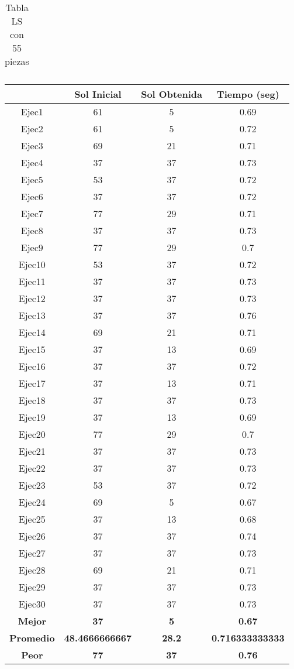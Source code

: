 \begin{center}
\begin{table}
\begin{tabular}{|c|c|c|c|}
\end{tabular}
\caption{Tabla LS con 55 piezas}
\end{table}

\begin{table}

\begin{tabular}{|c|c|c|c|}

\hline
 & {\bf Sol Inicial} & {\bf Sol Obtenida} & {\bf Tiempo (seg)} \\
\hline
Ejec1 & 61 & 5  & 0.69 \\
\hline
Ejec2 & 61 & 5  & 0.72 \\
\hline
Ejec3 & 69 & 21  & 0.71 \\
\hline
Ejec4 & 37 & 37  & 0.73 \\
\hline
Ejec5 & 53 & 37  & 0.72 \\
\hline
Ejec6 & 37 & 37  & 0.72 \\
\hline
Ejec7 & 77 & 29  & 0.71 \\
\hline
Ejec8 & 37 & 37  & 0.73 \\
\hline
Ejec9 & 77 & 29  & 0.7 \\
\hline
Ejec10 & 53 & 37  & 0.72 \\
\hline
Ejec11 & 37 & 37  & 0.73 \\
\hline
Ejec12 & 37 & 37  & 0.73 \\
\hline
Ejec13 & 37 & 37  & 0.76 \\
\hline
Ejec14 & 69 & 21  & 0.71 \\
\hline
Ejec15 & 37 & 13  & 0.69 \\
\hline
Ejec16 & 37 & 37  & 0.72 \\
\hline
Ejec17 & 37 & 13  & 0.71 \\
\hline
Ejec18 & 37 & 37  & 0.73 \\
\hline
Ejec19 & 37 & 13  & 0.69 \\
\hline
Ejec20 & 77 & 29  & 0.7 \\
\hline
Ejec21 & 37 & 37  & 0.73 \\
\hline
Ejec22 & 37 & 37  & 0.73 \\
\hline
Ejec23 & 53 & 37  & 0.72 \\
\hline
Ejec24 & 69 & 5  & 0.67 \\
\hline
Ejec25 & 37 & 13  & 0.68 \\
\hline
Ejec26 & 37 & 37  & 0.74 \\
\hline
Ejec27 & 37 & 37  & 0.73 \\
\hline
Ejec28 & 69 & 21  & 0.71 \\
\hline
Ejec29 & 37 & 37  & 0.73 \\
\hline
Ejec30 & 37 & 37  & 0.73 \\
\hline
{\bf Mejor} & {\bf 37} & {\bf 5} & {\bf 0.67} \\
\hline
{\bf Promedio} & {\bf 48.4666666667} & {\bf 28.2} & {\bf 0.716333333333} \\
\hline
{\bf Peor} & {\bf 77} & {\bf 37} & {\bf 0.76} \\
\hline


\end{tabular}
\end{table}
\end{center}
